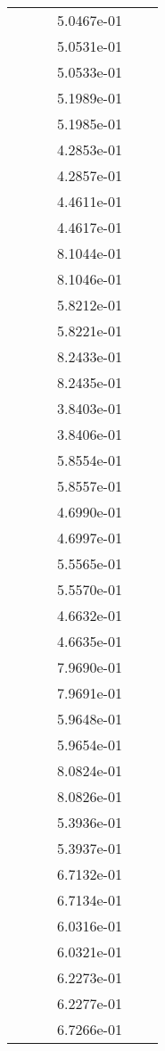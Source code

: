 \begin{xltabular}{\textwidth}{r|rS[table-format=1.3e+2]S[table-format=1.4e+2]S[table-format=1.4e+2]S[table-format=-1.5]}
&  &  & 5.0467e-01 & & \\
&  &  & 5.0531e-01 & & \\
&  &  & 5.0533e-01 & & \\
&  &  & 5.1989e-01 & & \\
&  &  & 5.1985e-01 & & \\
&  &  & 4.2853e-01 & & \\
&  &  & 4.2857e-01 & & \\
&  &  & 4.4611e-01 & & \\
&  &  & 4.4617e-01 & & \\
&  &  & 8.1044e-01 & & \\
&  &  & 8.1046e-01 & & \\
&  &  & 5.8212e-01 & & \\
&  &  & 5.8221e-01 & & \\
&  &  & 8.2433e-01 & & \\
&  &  & 8.2435e-01 & & \\
&  &  & 3.8403e-01 & & \\
&  &  & 3.8406e-01 & & \\
&  &  & 5.8554e-01 & & \\
&  &  & 5.8557e-01 & & \\
&  &  & 4.6990e-01 & & \\
&  &  & 4.6997e-01 & & \\
&  &  & 5.5565e-01 & & \\
&  &  & 5.5570e-01 & & \\
&  &  & 4.6632e-01 & & \\
&  &  & 4.6635e-01 & & \\
&  &  & 7.9690e-01 & & \\
&  &  & 7.9691e-01 & & \\
&  &  & 5.9648e-01 & & \\
&  &  & 5.9654e-01 & & \\
&  &  & 8.0824e-01 & & \\
&  &  & 8.0826e-01 & & \\
&  &  & 5.3936e-01 & & \\
&  &  & 5.3937e-01 & & \\
&  &  & 6.7132e-01 & & \\
&  &  & 6.7134e-01 & & \\
&  &  & 6.0316e-01 & & \\
&  &  & 6.0321e-01 & & \\
&  &  & 6.2273e-01 & & \\
&  &  & 6.2277e-01 & & \\
&  &  & 6.7266e-01 & & \\

\end{xltabular}
